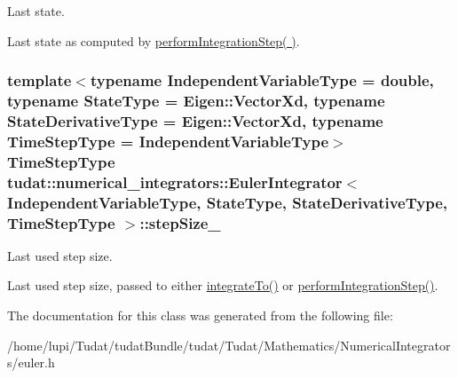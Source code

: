 Last state. 

Last state as computed by \hyperlink{classtudat_1_1numerical__integrators_1_1EulerIntegrator_a6ff2ab6fbde6cb97cfe77961963e4910}{perform\+Integration\+Step( )}. 
\subsubsection[{\texorpdfstring{step\+Size\+\_\+}{stepSize_}}]{\setlength{\rightskip}{0pt plus 5cm}template$<$typename Independent\+Variable\+Type  = double, typename State\+Type  = Eigen\+::\+Vector\+Xd, typename State\+Derivative\+Type  = Eigen\+::\+Vector\+Xd, typename Time\+Step\+Type  = Independent\+Variable\+Type$>$ Time\+Step\+Type {\bf tudat\+::numerical\+\_\+integrators\+::\+Euler\+Integrator}$<$ Independent\+Variable\+Type, State\+Type, State\+Derivative\+Type, Time\+Step\+Type $>$\+::step\+Size\+\_\+\hspace{0.3cm}{\ttfamily [protected]}}\hypertarget{classtudat_1_1numerical__integrators_1_1EulerIntegrator_a41ae773d51024c4388cba602ede31c58}{}\label{classtudat_1_1numerical__integrators_1_1EulerIntegrator_a41ae773d51024c4388cba602ede31c58}


Last used step size. 

Last used step size, passed to either \hyperlink{classtudat_1_1numerical__integrators_1_1NumericalIntegrator_aed0dfa86d274bd9e71c2fd6428edfd3e}{integrate\+To()} or \hyperlink{classtudat_1_1numerical__integrators_1_1EulerIntegrator_a6ff2ab6fbde6cb97cfe77961963e4910}{perform\+Integration\+Step()}. 

The documentation for this class was generated from the following file\+:\begin{DoxyCompactItemize}
\item 
/home/lupi/\+Tudat/tudat\+Bundle/tudat/\+Tudat/\+Mathematics/\+Numerical\+Integrators/euler.\+h\end{DoxyCompactItemize}
